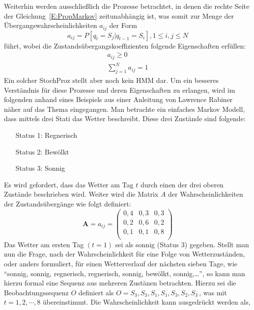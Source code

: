 Weiterhin werden ausschlie\ss lich die Prozesse betrachtet, in denen die rechte Seite der Gleichung~\ref{E:PropMarkov} zeitunabh\"angig ist, was somit zur Menge der \"Ubergangswahrscheinlichkeiten $a_{ij}$ der Form
\begin{equation}
\label{E:PropTrans}
a_{ij} = P[q_t = S_j | q_{t-1} = S_i], 1 \leq i, j \leq N
\end{equation}
f\"uhrt, wobei die Zustands\"ubergangskoeffizienten folgende Eigenschaften erf\"ullen:
\begin{subequations}
\begin{eqnarray}
\label{E:MarkovProperties}
a_{ij} \geq 0 \label{E:MarkovProperties1}\\
\sum_{j = 1}^{N} a_{ij} = 1 \label{E:MarkovProperties2}
\end{eqnarray}
\end{subequations}
Ein solcher \gls{StochProz} stellt aber noch kein \gls{HMM} dar.
\newline
Um ein besseres Verst\"andnis f\"ur diese Prozesse und deren Eigenschaften zu erlangen, wird im folgenden anhand eines Beispiels aus einer Anleitung von Lawrence Rabiner~\cite{bib:hmmrabiner} n\"aher auf das Thema eingegangen.
\newline
Man betrachte ein einfaches Markov Modell, dass mittels drei Stati das Wetter beschreibt. Diese drei Zust\"ande sind folgende:
\begin{itemize}
\item[Status 1:] Regnerisch
\item[Status 2:] Bew\"olkt
\item[Status 3:] Sonnig
\end{itemize}
Es wird gefordert, dass das Wetter am Tag $t$ durch einen der drei oberen Zust\"ande beschrieben wird. Weiter wird die Matrix $A$ der Wahrscheinlichkeiten der Zustands\"uberg\"ange wie folgt definiert:
\[
\label{E:MarkovProbMatrix}
\mathbf{A} = {a_{ij}} = 
\begin{pmatrix}
0,4 & 0,3 & 0,3 \\
0,2 & 0,6 & 0,2 \\
0,1 & 0,1 & 0,8 \\
\end{pmatrix}
\]
Das Wetter am ersten Tag $( t = 1)$ sei als sonnig (Status 3) gegeben. Stellt man nun die Frage, nach der Wahrscheinlichkeit f\"ur eine Folge von Wetterzust\"anden, oder anders formuliert, f\"ur einen Wetterverlauf der n\"achsten sieben Tage, wie \enquote{sonnig, sonnig, regnerisch, regnerisch, sonnig, bew\"olkt, sonnig,\ldots}, so kann man hierzu formal eine Sequenz aus mehreren Zust\"anen betrachten. Hierzu sei die Beobachtungssequenz $O$ definiert als $O = {S_3, S_3, S_1, S_1, S_3, S_2, S_3}\,$, was mit $t = 1, 2, \cdots, 8$ \"ubereinstimmt. Die Wahrscheinlichkeit kann ausgedr\"uckt werden als,
